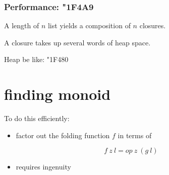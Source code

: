 \documentclass{beamer}
\begin{document}
\begin{frame}
    \frametitle{Performance: {\char"1F4A9}}
    A length of $n$ list yields a composition of $n$ closures.

    A closure takes up several words of heap space.

    Heap be like: {\char"1F480}

\end{frame}
\section{finding monoid}
To do this efficiently: 
\begin{itemize}
    \item factor out the folding function $f$ in terms of
\end{itemize}
\begin{equation*}
    f\ z\ l = op\ z\ (g\ l)
\end{equation*}
\begin{itemize}
    \item requires ingenuity
\end{itemize}
\end{document}
